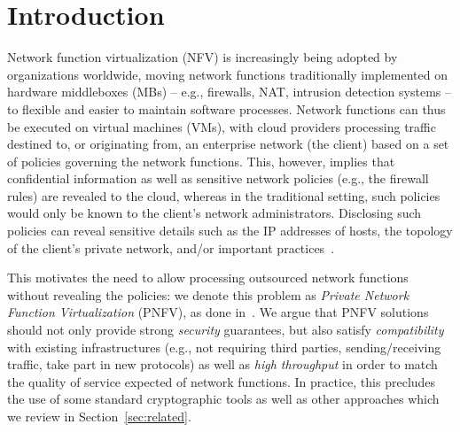 \RequirePackage{fix-cm} \let\oldvec\vec \documentclass{sig-alternate-05-2015}
\newif\ifshort
\begin{document}
\ifshort
\begin{CCSXML}
<ccs2012>
<concept>
<concept_id>10002978.10003014.10003015</concept_id>
<concept_desc>Security and privacy~Security protocols</concept_desc>
<concept_significance>500</concept_significance>
</concept>
<concept>
<concept_id>10003033.10003058.10003063</concept_id>
<concept_desc>Networks~Middleboxes / network appliances</concept_desc>
<concept_significance>500</concept_significance>
</concept>
</ccs2012>
\end{CCSXML}

\ccsdesc[500]{Security and privacy~Security protocols}
\ccsdesc[500]{Networks~Middleboxes / network appliances}

\printccsdesc

\keywords{Middlebox Privacy; Secret Sharing; Network Function Virtualization; Firewalls}
\fi


\section{Introduction}
Network function virtualization (NFV) is increasingly being adopted by organizations worldwide, 
moving network functions traditionally implemented on hardware middleboxes (MBs) -- e.g., firewalls, NAT, intrusion detection systems --
to flexible and easier to maintain software processes. Network functions can thus be executed on virtual machines (VMs), 
with cloud providers processing traffic destined to, or originating from, an enterprise network (the client) based on a set of policies governing the network functions. This, however, implies that confidential information as well as sensitive network policies (e.g., the firewall rules) are revealed to the cloud, whereas in the traditional setting, such policies would only be known to the client's network administrators. Disclosing such policies can reveal sensitive details such as  the IP addresses of hosts, the topology of the client's private network, and/or important practices~\cite{bf-firewall, mlm-firewall}. 

This motivates the need to allow processing outsourced network functions without revealing the policies: we denote this problem as {\em Private Network Function Virtualization} (PNFV), as done in~\cite{central-pnfv}. 
We argue that PNFV solutions should not only provide strong {\em security} guarantees, but also satisfy {\em compatibility} with existing infrastructures (e.g., not requiring third parties, sending/receiving traffic, take part in new protocols) as well as {\em high throughput} in order to match the quality of service expected of network functions. In practice, this precludes the use of some standard cryptographic tools as well as other approaches which we review in Section~\ref{sec:related}.
\end{document}
